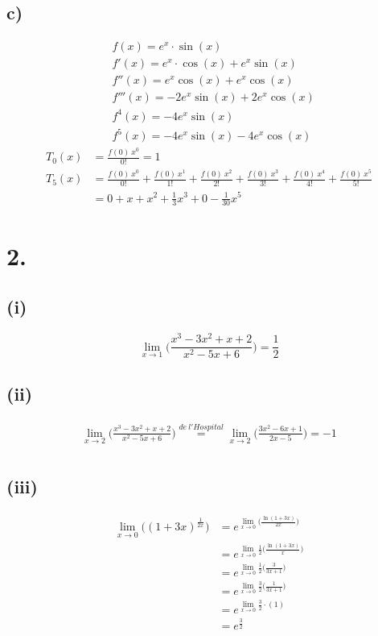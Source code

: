 \documentclass[a4paper]{scrartcl}
\begin{document}
\subsection{c)}
\begin{align}
&f(x) = e^x \cdot \sin(x) \\
&f'(x) = e^x \cdot \cos(x) + e^x \sin(x) \\
&f''(x) = e^x \cos(x) + e^x \cos(x) \\
&f'''(x) = -2e^x \sin(x) + 2e^x \cos(x) \\
&f^4(x) = -4e^x \sin(x) \\
&f^5(x) = -4e^x \sin(x) -4e^x \cos(x)
\end{align}
\begin{align}
T_0(x)&=\frac{f(0)\ x^0}{0!} = 1 \\
T_5(x)&=\frac{f(0)\ x^0}{0!} + \frac{f(0)\ x^1}{1!} + \frac{f(0)\ x^2}{2!} +
		\frac{f(0)\ x^3}{3!} + \frac{f(0)\ x^4}{4!} + \frac{f(0)\ x^5}{5!} \\
	  &=0 + x + x^2 + \frac 1 3 x^3 + 0 - \frac 1 {30} x^5
\end{align}

\newpage
\section{2.}
\subsection{(i)}
\[\lim_{x\to 1}\bigg(\frac{x^3-3x^2+x+2}{x^2-5x+6}\bigg)=\frac{1}{2}\]
\subsection{(ii)}
\begin{align}
\lim_{x\to 2}\bigg(\frac{x^3-3x^2+x+2}{x^2-5x+6}\bigg)\stackrel{de\ l'Hospital}{=} \lim_{x\to 2}\bigg(\frac{3x^2-6x+1}{2x-5}\bigg)=-1\\
\end{align}
\subsection{(iii)}
\begin{align}
\lim_{x\to 0}\Big((1+3x)^{\frac{1}{2x}}\Big)&=e^{\lim\limits_{x\to 0}\Big(\frac{\ln(1+3x)}{2x}\Big)}\\
	&=e^{\lim\limits_{x\to 0}\frac{1}{2}\Big(\frac{\ln(1+3x)}{x}\Big)}\\
	&=e^{\lim\limits_{x\to 0}\frac{1}{2}\Big(\frac{3}{3x+1}\Big)}\\	
	&=e^{\lim\limits_{x\to 0}\frac{3}{2}\Big(\frac{1}{3x+1}\Big)}\\
	&=e^{\lim\limits_{x\to 0}\frac{3}{2}\cdot(1)}\\
	&=e^{\frac{3}{2}}
\end{align}
\newpage
\end{document}
